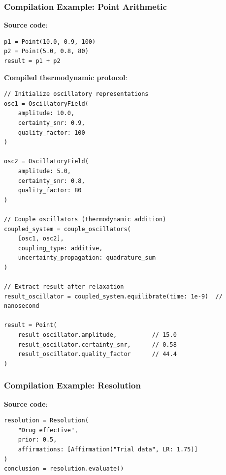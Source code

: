 \subsubsection{Compilation Example: Point Arithmetic}

\textbf{Source code}:
\begin{verbatim}
p1 = Point(10.0, 0.9, 100)
p2 = Point(5.0, 0.8, 80)
result = p1 + p2
\end{verbatim}

\textbf{Compiled thermodynamic protocol}:
\begin{verbatim}
// Initialize oscillatory representations
osc1 = OscillatoryField(
    amplitude: 10.0,
    certainty_snr: 0.9,
    quality_factor: 100
)

osc2 = OscillatoryField(
    amplitude: 5.0,
    certainty_snr: 0.8,
    quality_factor: 80
)

// Couple oscillators (thermodynamic addition)
coupled_system = couple_oscillators(
    [osc1, osc2],
    coupling_type: additive,
    uncertainty_propagation: quadrature_sum
)

// Extract result after relaxation
result_oscillator = coupled_system.equilibrate(time: 1e-9)  // nanosecond

result = Point(
    result_oscillator.amplitude,          // 15.0
    result_oscillator.certainty_snr,      // 0.58
    result_oscillator.quality_factor      // 44.4
)
\end{verbatim}

\subsubsection{Compilation Example: Resolution}

\textbf{Source code}:
\begin{verbatim}
resolution = Resolution(
    "Drug effective",
    prior: 0.5,
    affirmations: [Affirmation("Trial data", LR: 1.75)]
)
conclusion = resolution.evaluate()
\end{verbatim}

